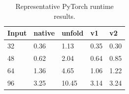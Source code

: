 \begin{table}[t]
\centering
\caption{Representative PyTorch runtime results.}
\label{tab:torch-runtime}
\begin{tabular}{lllll}
\toprule
Input & native & unfold & v1 & v2 \\
\midrule
32 & 0.36 & 1.13 & 0.35 & 0.30 \\
48 & 0.62 & 2.04 & 0.64 & 0.85 \\
64 & 1.36 & 4.65 & 1.06 & 1.22 \\
96 & 3.25 & 10.45 & 3.14 & 3.24 \\
\bottomrule
\end{tabular}
\end{table}
